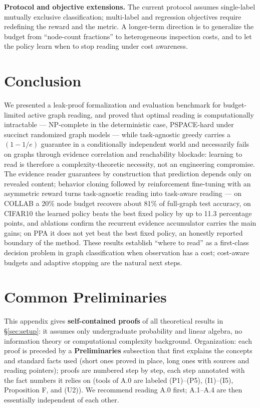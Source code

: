 \documentclass{article}
\begin{document}
\textbf{Protocol and objective extensions.} The current protocol assumes single-label mutually exclusive classification; multi-label and regression objectives require redefining the reward and the metric. A longer-term direction is to generalize the budget from ``node-count fractions'' to heterogeneous inspection costs, and to let the policy learn when to stop reading under cost awareness.

\section{Conclusion}
\label{sec:conclusion}

We presented a leak-proof formalization and evaluation benchmark for budget-limited active graph reading, and proved that optimal reading is computationally intractable --- NP-complete in the deterministic case, PSPACE-hard under succinct randomized graph models --- while task-agnostic greedy carries a $(1-1/e)$ guarantee in a conditionally independent world and necessarily fails on graphs through evidence correlation and reachability blockade: learning to read is therefore a complexity-theoretic necessity, not an engineering compromise. The evidence reader guarantees by construction that prediction depends only on revealed content; behavior cloning followed by reinforcement fine-tuning with an asymmetric reward turns task-agnostic reading into task-aware reading --- on COLLAB a 20\% node budget recovers about 81\% of full-graph test accuracy, on CIFAR10 the learned policy beats the best fixed policy by up to 11.3 percentage points, and ablations confirm the recurrent evidence accumulator carries the main gains; on PPA it does not yet beat the best fixed policy, an honestly reported boundary of the method. These results establish ``where to read'' as a first-class decision problem in graph classification when observation has a cost; cost-aware budgets and adaptive stopping are the natural next steps.

\appendix
\renewcommand{\thesection}{A.\arabic{section}}
\setcounter{section}{-1}

\section{Common Preliminaries}
\label{app:prelim}

This appendix gives \textbf{self-contained proofs} of all theoretical results in \S\ref{sec:setup}: it assumes only undergraduate probability and linear algebra, no information theory or computational complexity background. Organization: each proof is preceded by a \textbf{Preliminaries} subsection that first explains the concepts and standard facts used (short ones proved in place, long ones with sources and reading pointers); proofs are numbered step by step, each step annotated with the fact numbers it relies on (tools of A.0 are labeled (P1)--(P5), (I1)--(I5), Proposition F, and (U2)). We recommend reading A.0 first; A.1--A.4 are then essentially independent of each other.
\end{document}
